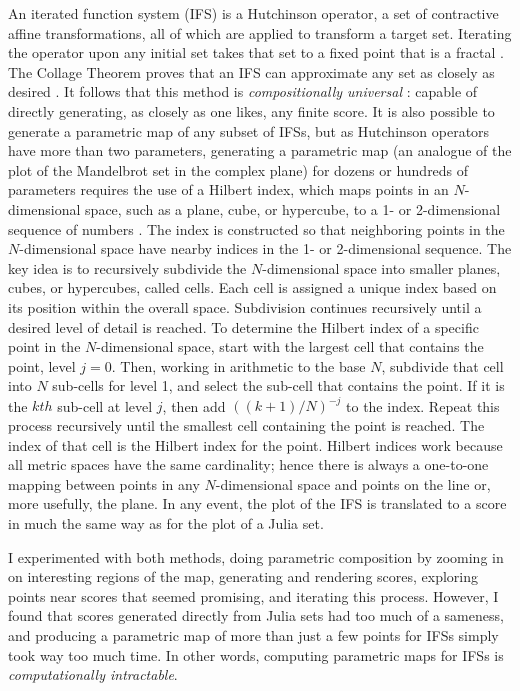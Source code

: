 \documentclass[11pt,papersize=a4]{scrartcl}
\begin{document}
An iterated function system (IFS) is a Hutchinson operator, a set of contractive affine transformations, all of which are applied to transform a target set. Iterating the operator upon any initial set takes that set to a fixed point that is a fractal \parencite{barnsley1985iterated, barnsley1993}. The Collage Theorem proves that an IFS can approximate any set as closely as desired \parencite{barnsley1989fractal, barnsley1993}. It follows that this method is \emph{compositionally universal} \parencite{obsessed, gogins2023scoregraphs}: capable of directly generating, as closely as one likes, any finite score. It is also possible to generate a parametric map of any subset of IFSs, but as Hutchinson operators have more than two parameters, generating a parametric map (an analogue of the plot of the Mandelbrot set in the complex plane) for dozens or hundreds of parameters requires the use of a Hilbert index, which maps points in an $N$-dimensional space, such as a plane, cube, or hypercube, to a 1- or 2-dimensional sequence of numbers \parencite{patrick1968mapping}. The index is constructed so that neighboring points in the $N$-dimensional space have nearby indices in the 1- or 2-dimensional sequence. The key idea is to recursively subdivide the $N$-dimensional space into smaller planes, cubes, or hypercubes, called cells. Each cell is assigned a unique index based on its position within the overall space. Subdivision continues recursively until a desired level of detail is reached. To determine the Hilbert index of a specific point in the $N$-dimensional space, start with the largest cell that contains the point, level $j = 0$. Then, working in arithmetic to the base $N$, subdivide that cell into $N$ sub-cells for level 1, and select the sub-cell that contains the point. If it is the $kth$ sub-cell at level $j$, then add $((k + 1)/N)^{-j}$ to the index. Repeat this process recursively until the smallest cell containing the point is reached. The index of that cell is  the Hilbert index for the point. Hilbert indices work because all metric spaces have the same cardinality; hence there is always a one-to-one mapping between points in any $N$-dimensional space and points on the line or, more usefully, the plane. In any event, the plot of the IFS is translated to a score in much the same way as for the plot of a Julia set.

I experimented with both methods, doing parametric composition by zooming in on interesting regions of the map, generating and rendering scores, exploring points near scores that seemed promising, and iterating this process. However, I found that scores generated directly from Julia sets had too much of a sameness, and producing a parametric map of more than just a few points for IFSs simply took way too much time. In other words, computing parametric maps for IFSs is \emph{computationally intractable}. 
\end{document}
